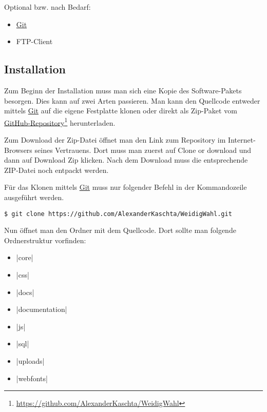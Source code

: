 \documentclass[ngerman]{ltxdoc}
\begin{document}
Optional bzw. nach Bedarf:

\begin{itemize}
  \item \href{https://git-scm.com/}{Git}
  \item FTP-Client
\end{itemize}

\subsection{Installation}

Zum Beginn der Installation muss man sich eine Kopie des Software-Pakets besorgen.
Dies kann auf zwei Arten passieren. Man kann den Quellcode entweder mittels \href{https://git-scm.com/}{Git}
auf die eigene Festplatte klonen oder direkt als Zip-Paket vom
\href{https://github.com/AlexanderKaschta/WeidigWahl}{GitHub-Repository}\footnote{\url{https://github.com/AlexanderKaschta/WeidigWahl}} herunterladen.

Zum Download der Zip-Datei öffnet man den Link zum Repository im Internet-Browsers
seines Vertrauens. Dort muss man zuerst auf \glqq Clone or download \grqq und dann
auf \glqq Download Zip \grqq klicken. Nach dem Download muss die entsprechende
ZIP-Datei noch entpackt werden.

Für das Klonen mittels \href{https://git-scm.com/}{Git} muss nur folgender Befehl
in der Kommandozeile ausgeführt werden.

\begin{lstlisting}[style=tex]
$ git clone https://github.com/AlexanderKaschta/WeidigWahl.git
\end{lstlisting}

Nun öffnet man den Ordner mit dem Quellcode. Dort sollte man folgende Ordnerstruktur vorfinden:

\begin{multicols}{3}
  \begin{itemize}
    \item |core|
    \item |css|
    \item |docs|
    \item |documentation|
    \item |js|
    \item |sql|
    \item |uploads|
    \item |webfonts|
  \end{itemize}
\end{multicols}
\end{document}
